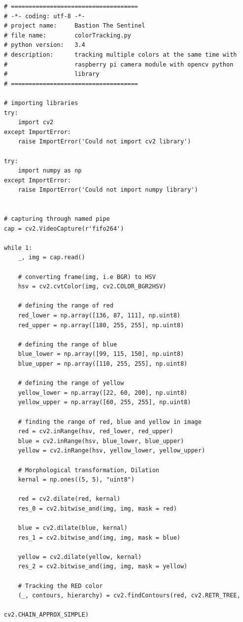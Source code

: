 \documentclass[12pt,a4paper]{article}
\begin{document}
\begin{verbatim}
# ====================================
# -*- coding: utf-8 -*-
# project name:     Bastion The Sentinel
# file name:        colorTracking.py
# python version:   3.4
# description:      tracking multiple colors at the same time with
#                   raspberry pi camera module with opencv python
#                   library
# ====================================

# importing libraries
try:
    import cv2
except ImportError:
    raise ImportError('Could not import cv2 library')

try:
    import numpy as np
except ImportError:
    raise ImportError('Could not import numpy library')


# capturing through named pipe
cap = cv2.VideoCapture(r'fifo264')

while 1:
    _, img = cap.read()

    # converting frame(img, i.e BGR) to HSV
    hsv = cv2.cvtColor(img, cv2.COLOR_BGR2HSV)

    # defining the range of red
    red_lower = np.array([136, 87, 111], np.uint8)
    red_upper = np.array([180, 255, 255], np.uint8)

    # defining the range of blue
    blue_lower = np.array([99, 115, 150], np.uint8)
    blue_upper = np.array([110, 255, 255], np.uint8)

    # defining the range of yellow
    yellow_lower = np.array([22, 60, 200], np.uint8)
    yellow_upper = np.array([60, 255, 255], np.uint8)

    # finding the range of red, blue and yellow in image
    red = cv2.inRange(hsv, red_lower, red_upper)
    blue = cv2.inRange(hsv, blue_lower, blue_upper)
    yellow = cv2.inRange(hsv, yellow_lower, yellow_upper)

    # Morphological transformation, Dilation
    kernal = np.ones((5, 5), "uint8")

    red = cv2.dilate(red, kernal)
    res_0 = cv2.bitwise_and(img, img, mask = red)

    blue = cv2.dilate(blue, kernal)
    res_1 = cv2.bitwise_and(img, img, mask = blue)

    yellow = cv2.dilate(yellow, kernal)
    res_2 = cv2.bitwise_and(img, img, mask = yellow)

    # Tracking the RED color
    (_, contours, hierarchy) = cv2.findContours(red, cv2.RETR_TREE, 
                                                    cv2.CHAIN_APPROX_SIMPLE)


\end{verbatim}
\end{document}

